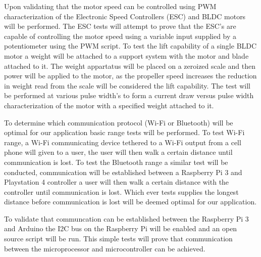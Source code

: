 Upon validating that the motor speed can be controlled using PWM characterization of the Electronic Speed Controllers (ESC) and BLDC motors will be performed. The ESC tests will attempt to prove that the ESC's are capable of controlling the motor speed using a variable input supplied by a potentiometer using the PWM script. To test the lift capability of a single BLDC motor a weight will be attached to a support system with the motor and blade attached to it. The weight appartatus will be placed on a zeroized scale and then power will be applied to the motor, as the propeller speed increases the reduction in weight read from the scale will be considered the lift capability. The test will be performed at various pulse width's to form a current draw versus pulse width characterization of the motor with a specified weight attached to it. 

To determine which communication protocol (Wi-Fi or Bluetooth) will be optimal for our application basic range tests will be performed. To test Wi-Fi range, a Wi-Fi communicating device tethered to a Wi-Fi output from a cell phone will given to a user, the user will then walk a certain distance until communication is lost. To test the Bluetooth range a similar test will be conducted, communication will be established between a Raspberry Pi 3 and Playstation 4 controller a user will then walk a certain distance with the controller until communication is lost. Which ever tests supplies the longest distance before communication is lost will be deemed optimal for our application.

To validate that communcation can be established between the Raspberry Pi 3 and Arduino the I2C bus on the Raspberry Pi will be enabled and an open source script will be run. This simple tests will prove that communication between the microprocessor and microcontroller can be achieved.
